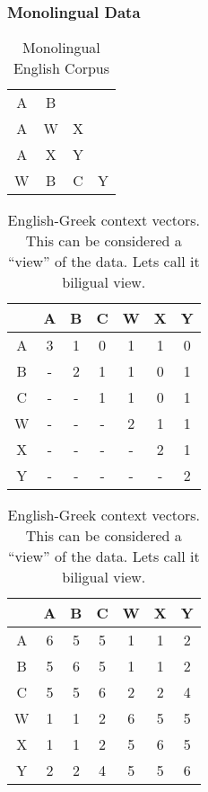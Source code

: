\documentclass{beamer}
\begin{document}
\begin{frame}
\frametitle{Monolingual Data}
\begin{table}[htbp]
  \centering
  \begin{tabular}{c c c c}
    A& B \\
    A& W& X \\
    A& X& Y   \\
    W& B& C& Y\\
  \end{tabular}
  \caption{Monolingual English Corpus}
  \label{tab:monolingual1}
\end{table}

\begin{table}[htbp]
  \centering
  \begin{tabular}{c | c c c c c c}
    & A& B& C& W& X& Y\\
    \hline
    A& 3& 1& 0& 1& 1& 0\\
    B& -& 2& 1& 1& 0& 1\\
    C& -& -& 1& 1& 0& 1\\
    W& -& -& -& 2& 1& 1\\
    X& -& -& -& -& 2& 1\\
    Y& -& -& -& -& -& 2\\
  \end{tabular}
  \caption{English-Greek context vectors. This can be considered a
    ``view'' of the data. Lets call it biligual view.}
  \label{tab:example1-2}
\end{table}
\end{frame}
\begin{frame}
\begin{table}[htbp]
  \centering
  \begin{tabular}{c | c c c c c c}
    & A& B& C& W& X& Y\\
    \hline
    A& 6& 5& 5& 1& 1& 2\\
    B& 5& 6& 5& 1& 1& 2\\
    C& 5& 5& 6& 2& 2& 4\\
    W& 1& 1& 2& 6& 5& 5\\
    X& 1& 1& 2& 5& 6& 5\\
    Y& 2& 2& 4& 5& 5& 6\\
  \end{tabular}
  \caption{English-Greek context vectors. This can be considered a
    ``view'' of the data. Lets call it biligual view.}
  \label{tab:example1-2}
\end{table}


\end{frame}
\end{document}
